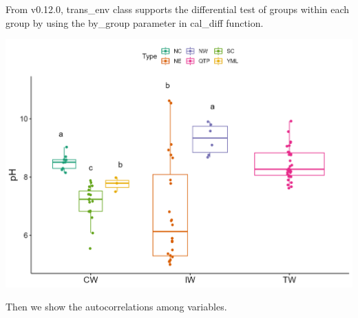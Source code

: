\documentclass[
]{book}
\newenvironment{Shaded}{\begin{snugshade}}{\end{snugshade}}
\newcommand{\AttributeTok}[1]{\textcolor[rgb]{0.77,0.63,0.00}{#1}}
\newcommand{\CommentTok}[1]{\textcolor[rgb]{0.56,0.35,0.01}{\textit{#1}}}
\newcommand{\DecValTok}[1]{\textcolor[rgb]{0.00,0.00,0.81}{#1}}
\newcommand{\FunctionTok}[1]{\textcolor[rgb]{0.00,0.00,0.00}{#1}}
\newcommand{\NormalTok}[1]{#1}
\newcommand{\SpecialCharTok}[1]{\textcolor[rgb]{0.00,0.00,0.00}{#1}}
\newcommand{\StringTok}[1]{\textcolor[rgb]{0.31,0.60,0.02}{#1}}
\begin{document}
From v0.12.0, trans\_env class supports the differential test of groups within each group by using the by\_group parameter in cal\_diff function.

\begin{Shaded}
\end{Shaded}

\begin{center}\includegraphics[width=600px]{Images/trans_env_diff_bygroup} \end{center}

Then we show the autocorrelations among variables.

\begin{Shaded}
\end{Shaded}
\end{document}
